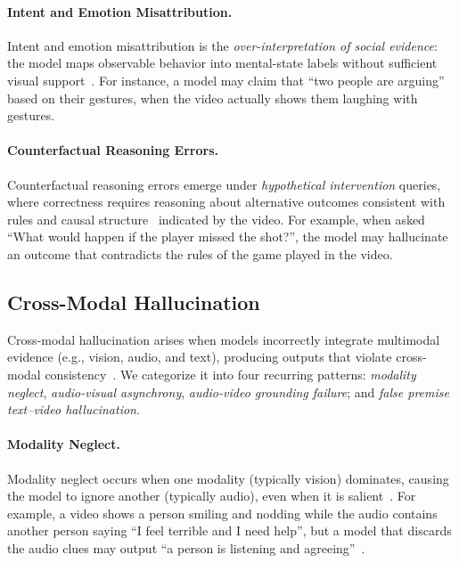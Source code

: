 \documentclass[10pt]{article} %
\begin{document}
\paragraph{Intent and Emotion Misattribution.}
Intent and emotion misattribution is the \emph{over-interpretation of social evidence}: the model maps observable behavior into mental-state labels without sufficient visual support~\citep{li2023intentqa, ye2024dual, peng2025svbench,chen2025through, kong2025siv}. For instance, a model may claim that ``two people are arguing'' based on their gestures, when the video actually shows them laughing with gestures.

\paragraph{Counterfactual Reasoning Errors.}
Counterfactual reasoning errors emerge under \emph{hypothetical intervention} queries, where correctness requires reasoning about alternative outcomes consistent with rules and causal structure~\citep{chen2025countervqa,huang2025taming,poppi2026countervid} indicated by the video. For example, when asked ``What would happen if the player missed the shot?'', the model may hallucinate an outcome that contradicts the rules of the game played in the video.

\subsection{Cross-Modal Hallucination}\label{subsec:cross-modal-hallucination}

Cross-modal hallucination arises when models incorrectly integrate multimodal evidence (e.g., vision, audio, and text), producing outputs that violate cross-modal consistency~\citep{guo2025aligned,shen2023fine}. We categorize it into four recurring patterns: \emph{modality neglect}, \emph{audio-visual asynchrony}, \emph{audio-video grounding failure}; and \emph{false premise text--video hallucination}.

\paragraph{Modality Neglect.}
Modality neglect occurs when one modality (typically vision) dominates, causing the model to ignore another (typically audio), even when it is salient~\citep{guo2025aligned,shen2023fine, li2025watch}. For example, a video shows a person smiling and nodding while the audio contains another person saying ``I feel terrible and I need help'', but a model that discards the audio clues may output ``a person is listening and agreeing''~\citep{hanna2024multi, cheng2024videollama}.
\end{document}
